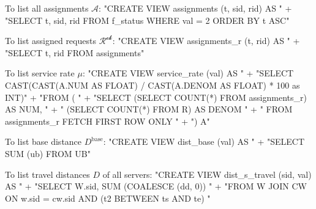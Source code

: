 \documentclass{article}
\def\nwendcode{\endtrivlist \endgroup}
\let\nwdocspar=\par
\theoremstyle{definition}
\begin{document}
To list all assignments $\mathcal{A}$:
\nwenddocs{}\endmoddef{}
"CREATE VIEW assignments (t, sid, rid) AS "
  + "SELECT t, sid, rid FROM f_status WHERE val = 2 ORDER BY t ASC"
\nwendcode{}\nwdocspar
To list assigned requests $\mathcal{R^\textrm{ok}}$:
\nwenddocs{}\endmoddef{}
"CREATE VIEW assignments_r (t, rid) AS "
  + "SELECT t, rid FROM assignments"
\nwendcode{}\nwdocspar
To list service rate $\mu$:
\nwenddocs{}\endmoddef{}
"CREATE VIEW service_rate (val) AS "
  + "SELECT CAST(CAST(A.NUM AS FLOAT) / CAST(A.DENOM AS FLOAT) * 100 as INT)"
  + "FROM ( "
  + "SELECT (SELECT COUNT(*) FROM assignments_r) AS NUM, "
  + "       (SELECT COUNT(*) FROM R) AS DENOM "
  + "       FROM assignments_r FETCH FIRST ROW ONLY "
  + ") A"
\nwendcode{}\nwdocspar
To list base distance $D^\textrm{base}$:
\nwenddocs{}\endmoddef{}
"CREATE VIEW dist_base (val) AS "
  + "SELECT SUM (ub) FROM UB"
\nwendcode{}\nwdocspar
To list travel distances $D$ of all servers:
\nwenddocs{}\endmoddef{}
"CREATE VIEW dist_s_travel (sid, val) AS "
  + "SELECT W.sid, SUM (COALESCE (dd, 0)) "
  + "FROM W JOIN CW ON w.sid = cw.sid AND (t2 BETWEEN ts AND te) "
\end{document}
